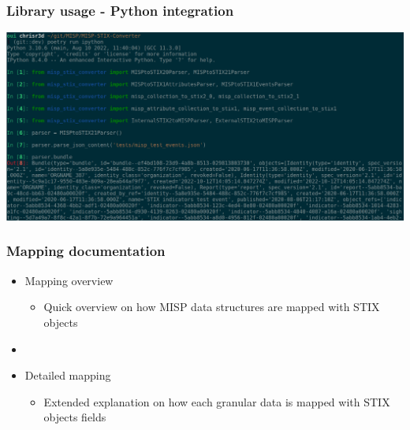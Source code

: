 \begin{frame}
    \frametitle{Library usage - Python integration}
    \centering
    \includegraphics[scale=0.12]{images/python_usage.png}
\end{frame}

\begin{frame}
    \frametitle{Mapping documentation}
    \begin{itemize}
        \item Mapping overview
        \begin{itemize}
            \item Quick overview on how MISP data structures are mapped with STIX objects
        \end{itemize}
        \item []
        \item Detailed mapping
        \begin{itemize}
            \item Extended explanation on how each granular data is mapped with STIX objects fields
        \end{itemize}
    \end{itemize}
\end{frame}

